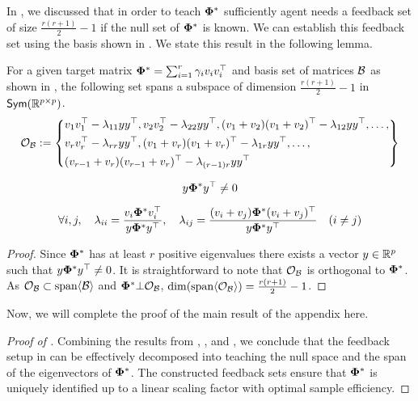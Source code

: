 In , we discussed that in order to teach $\boldsymbol{\Phi}^*$ sufficiently agent needs a feedback set of size $\frac{r(r+1)}{2} -1$ if the null set of $\boldsymbol{\Phi}^*$ is known. We can establish this feedback set using the basis shown in . We state this result in the following lemma.
\begin{lemma}\label{lem: orthocons}
    For a  given target matrix $\boldsymbol{\Phi}^* = \sum_{i=1}^r \gamma_iv_iv_i^{\top}$ and basis set of matrices ${\mathcal{B}}$ as shown in , the following set spans a subspace of dimension $\frac{r(r+1)}{2} -1$ in $\textsf{Sym}(\mathbb{R}^{p\times p})$. 
\begin{equation*}
\mathcal{O}_{{\mathcal{B}}} := \left\{
\begin{aligned}
&v_1v_1^{\top} - \lambda_{11}yy^{\top}, v_2v_2^{\top} - \lambda_{22}yy^{\top}, (v_1 + v_2)(v_1 + v_2)^{\top} - \lambda_{12}yy^{\top}, \ldots,\\
&v_rv_r^{\top} - \lambda_{rr}yy^{\top}, (v_1 + v_r)(v_1 + v_r)^{\top} - \lambda_{1r}yy^{\top}, \ldots, \\
&(v_{r-1} + v_r)(v_{r-1} + v_r)^{\top} - \lambda_{(r-1)r}yy^{\top}
\end{aligned}
\right\}
\end{equation*}

\begin{equation*}
y\boldsymbol{\Phi}^*y^{\top} \neq 0
\end{equation*}

\begin{equation*}
\forall i,j,\quad \lambda_{ii} = \frac{v_i\boldsymbol{\Phi}^*v_i^{\top}}{y\boldsymbol{\Phi}^*y^{\top}}, \quad \lambda_{ij} = \frac{(v_i + v_j)\boldsymbol{\Phi}^*(v_i+ v_j)^{\top}}{y\boldsymbol{\Phi}^*y^{\top}} \quad (i \neq j)
\end{equation*}


\end{lemma}
\begin{proof}
    Since $\boldsymbol{\Phi}^*$ has at least $r$ positive eigenvalues there exists a vector $y \in \mathbb{R}^p$ such that $y\boldsymbol{\Phi}^*y^{\top} \neq 0$. It is straightforward to note that $\mathcal{O}_{{\mathcal{B}}}$ is orthogonal to $\boldsymbol{\Phi}^*$. As $\mathcal{O}_{{\mathcal{B}}} \subset \text{span}\langle {\mathcal{B}} \rangle$ and $\boldsymbol{\Phi}^* \bot \mathcal{O}_{{\mathcal{B}}}$, $\dim(\text{span}\langle \mathcal{O}_{{\mathcal{B}}} \rangle) = \frac{r(r+1)}{2} -1$. 
\end{proof}

Now, we will complete the proof of the main result of the appendix here.

\begin{proof}[Proof of ]
Combining the results from , , and , we conclude that the feedback setup in  can be effectively decomposed into teaching the null space and the span of the eigenvectors of $\boldsymbol{\Phi}^*$. The constructed feedback sets ensure that $\boldsymbol{\Phi}^*$ is uniquely identified up to a linear scaling factor with optimal sample efficiency.    
\end{proof}

